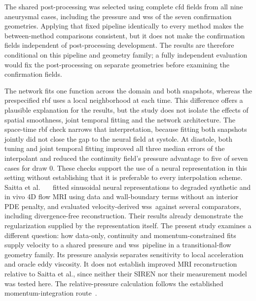 \documentclass[12pt,a4paper]{article}
\newcommand{\cfdrevision}[1]{#1} %
\newcommand{\CFD}{\ac{cfd}\xspace}
\newcommand{\WSS}{\ac{wss}\xspace}
\newcommand{\RBF}{\ac{rbf}\xspace}
\theoremstyle{definition}
\numberwithin{equation}{section}
\providecommand{\DIFaddtex}[1]{{\protect\color{blue} \sf #1}} %
\providecommand{\DIFdeltex}[1]{{\protect\color{red} \scriptsize #1}} %
\providecommand{\DIFaddbegin}{} %
\providecommand{\DIFaddend}{} %
\providecommand{\DIFdelbegin}{} %
\providecommand{\DIFdelend}{} %
\providecommand{\DIFadd}[1]{\texorpdfstring{\DIFaddtex{#1}}{#1}} %
\providecommand{\DIFdel}[1]{\texorpdfstring{\DIFdeltex{#1}}{}} %
\newcommand{\DIFscaledelfig}{0.5}
\newlength{\DIFdelgraphicswidth} %
\newlength{\DIFdelgraphicsheight} %
\newcommand{\DIFaddincludegraphics}[2][]{{\color{blue}\fbox{\DIFOincludegraphics[#1]{#2}}}} %
\newcommand{\DIFdelincludegraphics}[2][]{%
\sbox{\DIFdelgraphicsbox}{\DIFOincludegraphics[#1]{#2}}%
\settoboxwidth{\DIFdelgraphicswidth}{\DIFdelgraphicsbox} %
\settoboxtotalheight{\DIFdelgraphicsheight}{\DIFdelgraphicsbox} %
\scalebox{\DIFscaledelfig}{%
\parbox[b]{\DIFdelgraphicswidth}{\usebox{\DIFdelgraphicsbox}\\[-\baselineskip] \rule{\DIFdelgraphicswidth}{0em}}\llap{\resizebox{\DIFdelgraphicswidth}{\DIFdelgraphicsheight}{%
\setlength{\unitlength}{\DIFdelgraphicswidth}%
\begin{picture}(1,1)%
\thicklines\linethickness{2pt} %
{\color[rgb]{1,0,0}\put(0,0){\framebox(1,1){}}}%
{\color[rgb]{1,0,0}\put(0,0){\line( 1,1){1}}}%
{\color[rgb]{1,0,0}\put(0,1){\line(1,-1){1}}}%
\end{picture}%
}\hspace*{3pt}}} %
} %
\DeclareRobustCommand{\DIFaddbegin}{\DIFOaddbegin \let\includegraphics\DIFaddincludegraphics} %
\DeclareRobustCommand{\DIFaddend}{\DIFOaddend \let\includegraphics\DIFOincludegraphics} %
\DeclareRobustCommand{\DIFdelbegin}{\DIFOdelbegin \let\includegraphics\DIFdelincludegraphics} %
\DeclareRobustCommand{\DIFdelend}{\DIFOaddend \let\includegraphics\DIFOincludegraphics} %
\renewcommand{\DIFaddtex}[1]{{\protect\color{red}#1}}
\renewcommand{\DIFdeltex}[1]{}
\renewcommand{\DIFdel}[1]{}
\renewcommand{\DIFaddincludegraphics}[2][]{\DIFOincludegraphics[#1]{#2}}
\renewcommand{\DIFdelincludegraphics}[2][]{}
\renewcommand{\cfdrevision}[1]{\textcolor{red}{#1}}
\def\DIFaddbegin{}\def\DIFaddend{}%
\def\DIFdelbegin{}\def\DIFdelend{}%
\def\cfdrevision#1{#1}%
\begin{document}
\DIFadd{\cfdrevision{The shared post-processing was selected using complete \CFD fields from all nine aneurysmal cases, including the pressure and \WSS of the seven confirmation geometries. Applying that fixed pipeline identically to every method makes the between-method comparisons consistent, but it does not make the confirmation fields independent of post-processing development. The results are therefore conditional on this pipeline and geometry family; a fully independent evaluation would fix the post-processing on separate geometries before examining the confirmation fields.}
}

\DIFaddend The network fits one function across the domain and both snapshots, whereas the prespecified \RBF uses a local neighborhood at each time. This difference offers a plausible explanation for the results, but the study does not isolate the effects of spatial smoothness, joint temporal fitting and the network architecture. The space-time \RBF check narrows that interpretation, because fitting both snapshots jointly did not close the gap to the neural field at systole. At diastole, both tuning and joint temporal fitting improved all three median errors of the interpolant and reduced the continuity field's pressure advantage to five of seven cases for draw 0. These checks support the use of a neural representation in this setting without establishing that it is preferable to every interpolation scheme. \DIFdelbegin \DIFdel{Related work has used implicit neural representations for }\DIFdelend \DIFaddbegin \DIFadd{Saitta et al.~\mbox{%
\cite{saitta2024implicit} }\hskip0pt%
fitted sinusoidal neural representations to degraded synthetic and in vivo }\DIFaddend 4D flow \DIFdelbegin \DIFdel{reconstruction without a physics loss~\mbox{%
\cite{saitta2024implicit}}\hskip0pt%
; here, }\DIFdelend \DIFaddbegin \DIFadd{MRI using data and wall-boundary terms without an interior PDE penalty, and evaluated velocity-derived }\WSS{}\ \DIFadd{against several comparators, including divergence-free reconstruction. Their results already demonstrate the regularization supplied by the representation itself. The present study examines a different question: how data-only, continuity and momentum-constrained fits supply velocity to a shared pressure and }\WSS{}\ \DIFadd{pipeline in a transitional-flow geometry family. Its pressure analysis separates sensitivity to local acceleration and oracle eddy viscosity. It does not establish improved MRI reconstruction relative to Saitta et al., since neither their SIREN nor their measurement model was tested here. The relative-pressure calculation follows }\DIFaddend the \DIFdelbegin \DIFdel{representation supplies velocity to the }\DIFdelend established momentum-integration route\DIFdelbegin \DIFdel{for relative pressure}\DIFdelend ~\cite{krittian2012finite,bertoglio2018relative}.
\end{document}
